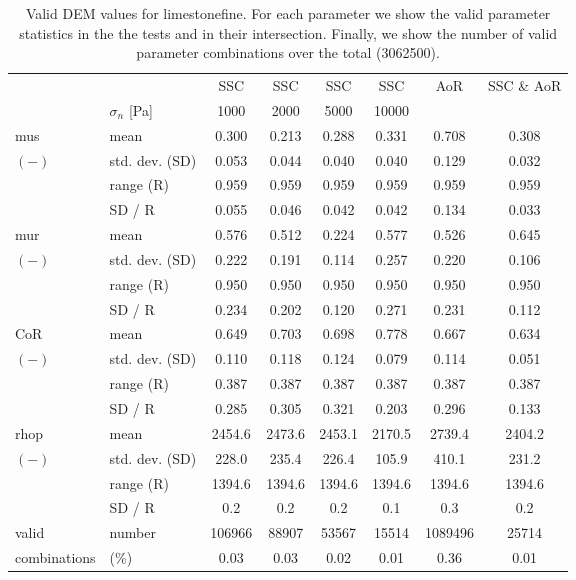\begin{table}[htbp] 
 \centering 
\begin{tabular}{ll|cccccc} 
 \hline 
 &    & SSC & SSC & SSC & SSC & AoR   & SSC \& AoR \\ 
 & $\sigma_n$  [Pa]  & 1000 & 2000 & 5000 & 10000 &   &  \\ 
 \hline 
\acs{mus} & mean & 0.300 & 0.213 & 0.288 & 0.331 & 0.708 & 0.308 \\ 
$(-)$ & std. dev. (SD) & 0.053 & 0.044 & 0.040 & 0.040 & 0.129 & 0.032 \\ 
 & range (\acs{R}) & 0.959 & 0.959 & 0.959 & 0.959 & 0.959 & 0.959 \\ 
 & SD / R & 0.055 & 0.046 & 0.042 & 0.042 & 0.134 & 0.033 \\ 
 \hline 
\acs{mur} & mean & 0.576 & 0.512 & 0.224 & 0.577 & 0.526 & 0.645 \\ 
$(-)$ & std. dev. (SD) & 0.222 & 0.191 & 0.114 & 0.257 & 0.220 & 0.106 \\ 
 & range (\acs{R}) & 0.950 & 0.950 & 0.950 & 0.950 & 0.950 & 0.950 \\ 
 & SD / R & 0.234 & 0.202 & 0.120 & 0.271 & 0.231 & 0.112 \\ 
 \hline 
\acs{CoR} & mean & 0.649 & 0.703 & 0.698 & 0.778 & 0.667 & 0.634 \\ 
$(-)$ & std. dev. (SD) & 0.110 & 0.118 & 0.124 & 0.079 & 0.114 & 0.051 \\ 
 & range (\acs{R}) & 0.387 & 0.387 & 0.387 & 0.387 & 0.387 & 0.387 \\ 
 & SD / R & 0.285 & 0.305 & 0.321 & 0.203 & 0.296 & 0.133 \\ 
 \hline 
\acs{rhop} & mean & 2454.6 & 2473.6 & 2453.1 & 2170.5 & 2739.4 & 2404.2 \\ 
$(-)$ & std. dev. (SD) & 228.0 & 235.4 & 226.4 & 105.9 & 410.1 & 231.2 \\ 
 & range (\acs{R}) & 1394.6 & 1394.6 & 1394.6 & 1394.6 & 1394.6 & 1394.6 \\ 
 & SD / R &  0.2 &  0.2 &  0.2 &  0.1 &  0.3 &  0.2 \\ 
 \hline 
valid & number & 106966 & 88907 & 53567 & 15514 & 1089496 & 25714 \\ 
combinations & (\%)  & 0.03 & 0.03 & 0.02 & 0.01 & 0.36 & 0.01 \\ 
 \hline 
\end{tabular} 
\caption[Valid DEM values for limestonefine]{Valid DEM values for limestonefine. For each parameter we show the valid parameter statistics in the the tests and in their intersection. Finally, we show the number of valid parameter combinations over the total (3062500).} 
\label{tab:30DEMvalidvalueslimestonefine} 
\end{table}